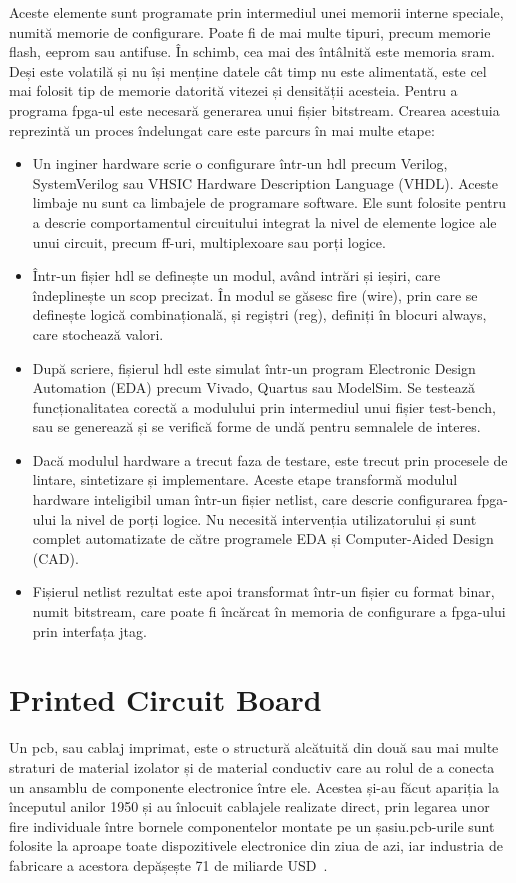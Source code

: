 \documentclass[12pt,a4paper]{report}
\begin{document}
Aceste elemente sunt programate prin intermediul unei memorii interne speciale, numită memorie de configurare. Poate fi de mai multe tipuri, precum memorie flash, \gls{eeprom} sau antifuse. În schimb, cea mai des întâlnită este memoria \gls{sram}. Deși este volatilă și nu își menține datele cât timp nu este alimentată, este cel mai folosit tip de memorie datorită vitezei și densității acesteia. Pentru a programa \gls{fpga}-ul este necesară generarea unui fișier bitstream. Crearea acestuia reprezintă un proces îndelungat care este parcurs în mai multe etape:
\begin{itemize}
\item Un inginer hardware scrie o configurare într-un \gls{hdl} precum Verilog, SystemVerilog sau VHSIC Hardware Description Language (VHDL). Aceste limbaje nu sunt ca limbajele de programare software. Ele sunt folosite pentru a descrie comportamentul circuitului integrat la nivel de elemente logice ale unui circuit, precum \gls{ff}-uri, multiplexoare sau porți logice.
\item Într-un fișier \gls{hdl} se definește un modul, având intrări și ieșiri, care îndeplinește un scop precizat. În modul se găsesc fire (wire), prin care se definește logică combinațională, și regiștri (reg), definiți în blocuri always, care stochează valori. 
\item După scriere, fișierul \gls{hdl} este simulat într-un program Electronic Design Automation (EDA) precum Vivado, Quartus sau ModelSim. Se testează funcționalitatea corectă a modulului prin intermediul unui fișier test-bench, sau se generează și se verifică forme de undă pentru semnalele de interes.
\item Dacă modulul hardware a trecut faza de testare, este trecut prin procesele de lintare, sintetizare și implementare. Aceste etape transformă modulul hardware inteligibil uman într-un fișier netlist, care descrie configurarea \gls{fpga}-ului la nivel de porți logice. Nu necesită intervenția utilizatorului și sunt complet automatizate de către programele EDA și Computer-Aided Design (CAD).
\item Fișierul netlist rezultat este apoi transformat într-un fișier cu format binar, numit bitstream, care poate fi încărcat în memoria de configurare a \gls{fpga}-ului prin interfața \gls{jtag}.
\end{itemize}

\section{Printed Circuit Board}
Un \gls{pcb}, sau cablaj imprimat, este o structură alcătuită din două sau mai multe straturi de material izolator și de material conductiv care au rolul de a conecta un ansamblu de componente electronice între ele. Acestea și-au făcut apariția la începutul anilor 1950 și au înlocuit cablajele realizate direct, prin legarea unor fire individuale între bornele componentelor montate pe un șasiu.\@ \gls{pcb}-urile sunt folosite la aproape toate dispozitivele electronice din ziua de azi, iar industria de fabricare a acestora depășește 71 de miliarde USD~\cite{pcb_market_cap}.
\end{document}
